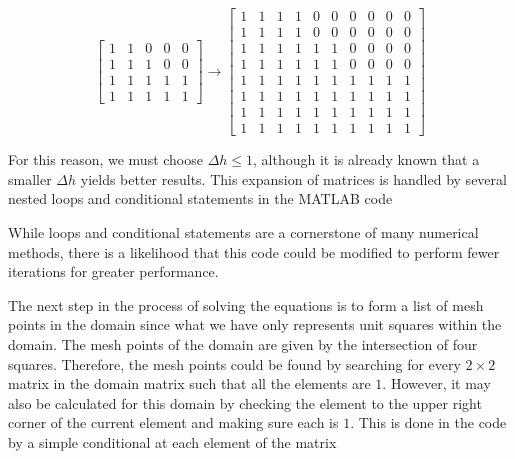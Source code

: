 \documentclass[10pt,a4paper]{article}
\begin{document}
\begin{displaymath}
\left[
\begin{matrix}
1 & 1 & 0 & 0 & 0 \\
1 & 1 & 1 & 0 & 0 \\
1 & 1 & 1 & 1 & 1 \\
1 & 1 & 1 & 1 & 1
\end{matrix}
\right]
\to
\left[
\begin{matrix}
1 & 1 & 1 & 1 & 0 & 0 & 0 & 0 & 0 & 0 \\
1 & 1 & 1 & 1 & 0 & 0 & 0 & 0 & 0 & 0 \\
1 & 1 & 1 & 1 & 1 & 1 & 0 & 0 & 0 & 0 \\
1 & 1 & 1 & 1 & 1 & 1 & 0 & 0 & 0 & 0 \\
1 & 1 & 1 & 1 & 1 & 1 & 1 & 1 & 1 & 1 \\
1 & 1 & 1 & 1 & 1 & 1 & 1 & 1 & 1 & 1 \\
1 & 1 & 1 & 1 & 1 & 1 & 1 & 1 & 1 & 1 \\
1 & 1 & 1 & 1 & 1 & 1 & 1 & 1 & 1 & 1
\end{matrix}
\right]
\end{displaymath}

For this reason, we must choose $\Delta h \leq 1$, although it is already known that a smaller $\Delta h$ yields better results. This expansion of matrices is handled by several nested loops and conditional statements in the MATLAB code



While loops and conditional statements are a cornerstone of many numerical methods, there is a likelihood that this code could be modified to perform fewer iterations for greater performance.

The next step in the process of solving the equations is to form a list of mesh points in the domain since what we have only represents unit squares within the domain. The mesh points of the domain are given by the intersection of four squares. Therefore, the mesh points could be found by searching for every $2 \times 2$ matrix in the domain matrix such that all the elements are $1$. However, it may also be calculated for this domain by checking the element to the upper right corner of the current element and making sure each is $1$. This is done in the code by a simple conditional at each element of the matrix


\end{document}
